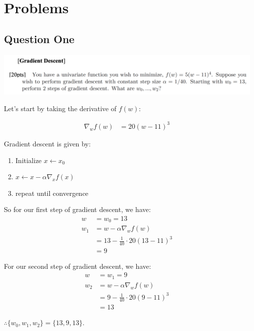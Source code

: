 \section{Problems}

\subsection{Question One}
\includegraphics[width=1\textwidth]{media/hw4_q1.png}

Let's start by taking the derivative of $f(w)$:

\begin{align}
    \nabla_w f(w) &= 20(w-11)^3 \label{eq:q1_1}
\end{align}

Gradient descent is given by:
\begin{enumerate}
    \item Initialize $x \leftarrow x_0$
    \item $x \leftarrow x - \alpha \nabla_x f(x)$
    \item repeat until convergence
\end{enumerate}

So for our first step of gradient descent, we have:
\begin{align}
    w &= w_0 = 13 \label{eq:q1_2} \nonumber \\
    w_1 &= w - \alpha \nabla_w f(w) \nonumber \\
    &= 13 - \frac{1}{40} \cdot 20(13-11)^3 \nonumber \\
    &= 9
\end{align}

For our second step of gradient descent, we have:
\begin{align}
    w &= w_1 = 9 \label{eq:q1_3} \nonumber \\
    w_2 &= w - \alpha \nabla_w f(w) \nonumber \\
    &= 9 - \frac{1}{40} \cdot 20(9-11)^3 \nonumber \\
    &= 13
\end{align}

$\therefore \{w_0, w_1, w_2\} = \{13,9,13\}$.

